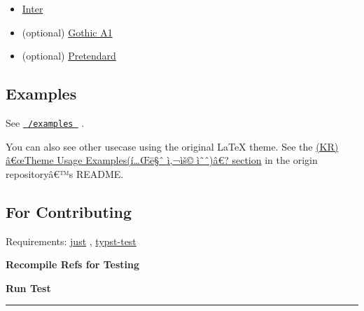 \begin{itemize}
\tightlist
\item
  \href{https://fonts.google.com/specimen/Inter}{Inter}
\item
  (optional) \href{https://fonts.google.com/specimen/Gothic+A1}{Gothic
  A1}
\item
  (optional)
  \href{https://github.com/orioncactus/pretendard/blob/main/packages/pretendard/docs/en/README.md}{Pretendard}
\end{itemize}

\subsection{Examples}\label{examples}

See
\href{https://github.com/typst/packages/raw/main/packages/preview/ucpc-solutions/0.1.0/examples/}{\texttt{\ /examples\ }}
.

You can also see other usecase using the original LaTeX theme. See the
\href{https://github.com/ucpcc/2020-solutions-theme\#\%ED\%85\%8C\%EB\%A7\%88-\%EC\%82\%AC\%EC\%9A\%A9-\%EC\%98\%88}{(KR)
â€œTheme Usage Examples(í\ldots Œë§ˆ ì‚¬ìš© ì˜ˆ)â€? section} in the
origin repositoryâ€™s README.

\subsection{For Contributing}\label{for-contributing}

Requirements: \href{https://github.com/casey/just}{just} ,
\href{https://github.com/tingerrr/typst-test}{typst-test}

\textbf{Recompile Refs for Testing}

\begin{Shaded}
\begin{Highlighting}[]
\end{Highlighting}
\end{Shaded}

\textbf{Run Test}

\begin{Shaded}
\begin{Highlighting}[]
\end{Highlighting}
\end{Shaded}

\begin{center}\rule{0.5\linewidth}{0.5pt}\end{center}

